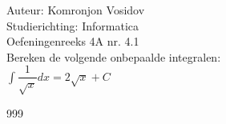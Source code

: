 \documentclass[a4paper]{article}
\newcommand{\dint}{\displaystyle\int}
\begin{document}
	
	\noindent \large Auteur: Komronjon Vosidov \\
	\noindent \large Studierichting: Informatica\\
	\noindent \large Oefeningenreeks 4A nr. 4.1\\
	
	
	\medskip
	\normalsize
	Bereken de volgende onbepaalde integralen:\\
	
$ \dint \dfrac{1}{\sqrt{x}}  dx = 2 \sqrt{x} + C $
	
	
	
	
	
	
	
	\begin{thebibliography}{999}
	\end{thebibliography}		
\end{document}
